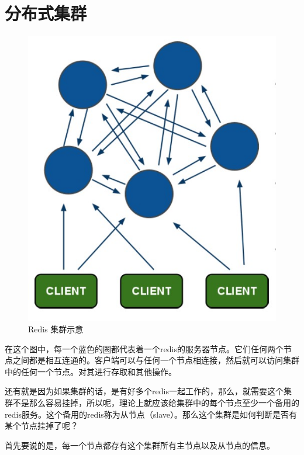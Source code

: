 \documentclass[UTF8,a4paper,12pt]{ctexbook}
\begin{document}
		
		
	\section{分布式集群}
		 \begin{figure}[H]
				\centering
				\includegraphics[scale=0.5]{cluster}
				\caption{Redis 集群示意}
		 \end{figure}
		 
		在这个图中，每一个蓝色的圈都代表着一个redis的服务器节点。它们任何两个节点之间都是相互连通的。客户端可以与任何一个节点相连接，然后就可以访问集群中的任何一个节点。对其进行存取和其他操作。
		
		还有就是因为如果集群的话，是有好多个redis一起工作的，那么，就需要这个集群不是那么容易挂掉，所以呢，理论上就应该给集群中的每个节点至少一个备用的redis服务。这个备用的redis称为从节点（slave）。那么这个集群是如何判断是否有某个节点挂掉了呢？
		
		首先要说的是，每一个节点都存有这个集群所有主节点以及从节点的信息。
			
\end{document}
